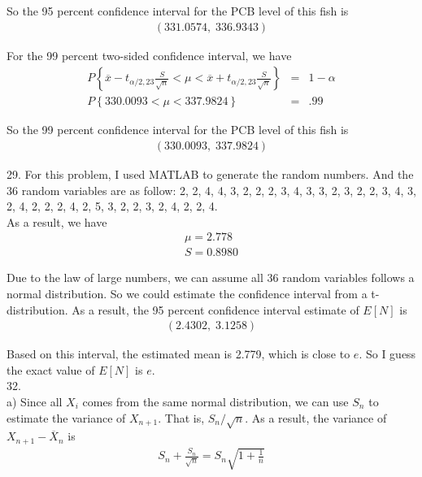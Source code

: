 \documentclass[12pt]{article}
\begin{document}
So the 95 percent confidence interval for the PCB level of this fish is
\begin{eqnarray*}
  \left( 331.0574, \; 336.9343 \right)
\end{eqnarray*}

For the 99 percent two-sided confidence interval, we have
\begin{eqnarray*}
  P \left\{ \overline{x} - t_{\alpha / 2, 23} \frac {S}{\sqrt{n}} < \mu
    < \overline{x} + t_{\alpha / 2, 23} \frac {S}{\sqrt{n}}
  \right\} &=& 1 - \alpha \\
  P \left\{ 330.0093 < \mu < 337.9824 \right\} &=& .99
\end{eqnarray*}

So the 99 percent confidence interval for the PCB level of this fish is
\begin{eqnarray*}
  \left( 330.0093, \; 337.9824 \right)
\end{eqnarray*}

29. For this problem, I used MATLAB to generate the random numbers. And the 36 random variables are as follow: 2, 2, 4, 4, 3, 2, 2, 2, 3, 4, 3, 3, 2, 3, 2, 2, 3, 4, 3, 2, 4, 2, 2, 2, 4, 2, 5, 3, 2, 2, 3, 2, 4, 2, 2, 4. \\

As a result, we have
\begin{eqnarray*}
  \mu = 2.778 \\
  S = 0.8980
\end{eqnarray*}

Due to the law of large numbers, we can assume all 36 random variables follows a normal distribution. So we could estimate the confidence interval from a t-distribution. As a result, the 95 percent confidence interval estimate of $E[N]$ is
\begin{eqnarray*}
  \left( 2.4302, \; 3.1258 \right)
\end{eqnarray*}

Based on this interval, the estimated mean is 2.779, which is close to $e$. So I guess the exact value of $E[N]$ is $e$. \\

32. \\
a) Since all $X_i$ comes from the same normal distribution, we can use $S_n$ to estimate the variance of $X_{n+1}$. That is, $S_n / \sqrt{n}$. As a result, the variance of $X_{n+1} - \overline{X}_n$ is
\begin{eqnarray*}
  S_n + \frac {S_n}{\sqrt{n}} = S_n \sqrt{1 + \frac{1}{n}}
\end{eqnarray*}
\end{document}
